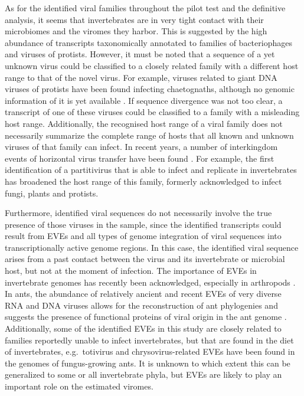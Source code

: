 \documentclass[
  openany]{book}
\begin{document}
As for the identified viral families throughout the pilot test and the definitive analysis, it seems that invertebrates are in very tight contact with their microbiomes and the viromes they harbor. This is suggested by the high abundance of transcripts taxonomically annotated to families of bacteriophages and viruses of protists. However, it must be noted that a sequence of a yet unknown virus could be classified to a closely related family with a different host range to that of the novel virus. For example, viruses related to giant DNA viruses of protists have been found infecting chaetognaths, although no genomic information of it is yet available \autocite{Shinn2018}. If sequence divergence was not too clear, a transcript of one of these viruses could be classified to a family with a misleading host range. Additionally, the recognised host range of a viral family does not necessarily summarize the complete range of hosts that all known and unknown viruses of that family can infect. In recent years, a number of interkingdom events of horizontal virus transfer have been found \autocite{Liu2016,Nerva2017}. For example, the first identification of a partitivirus that is able to infect and replicate in invertebrates \autocite{Cross2020} has broadened the host range of this family, formerly acknowledged to infect fungi, plants and protists.

Furthermore, identified viral sequences do not necessarily involve the true presence of those viruses in the sample, since the identified transcripts could result from EVEs and all types of genome integration of viral sequences into transcriptionally active genome regions. In this case, the identified viral sequence arises from a past contact between the virus and its invertebrate or microbial host, but not at the moment of infection. The importance of EVEs in invertebrate genomes has recently been acknowledged, especially in arthropods \autocite{Flynn2019}. In ants, the abundance of relatively ancient and recent EVEs of very diverse RNA and DNA viruses allows for the reconstruction of ant phylogenies and suggests the presence of functional proteins of viral origin in the ant genome \autocite{TerHorst2019}. Additionally, some of the identified EVEs in this study are closely related to families reportedly unable to infect invertebrates, but that are found in the diet of invertebrates, e.g.~totivirus and chrysovirus-related EVEs have been found in the genomes of fungus-growing ants. It is unknown to which extent this can be generalized to some or all invertebrate phyla, but EVEs are likely to play an important role on the estimated viromes.
\end{document}
